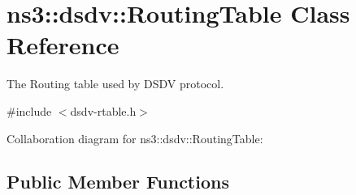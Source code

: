 \hypertarget{classns3_1_1dsdv_1_1RoutingTable}{}\section{ns3\+:\+:dsdv\+:\+:Routing\+Table Class Reference}
\label{classns3_1_1dsdv_1_1RoutingTable}


The Routing table used by D\+S\+DV protocol.  




{\ttfamily \#include $<$dsdv-\/rtable.\+h$>$}



Collaboration diagram for ns3\+:\+:dsdv\+:\+:Routing\+Table\+:
\subsection*{Public Member Functions}
